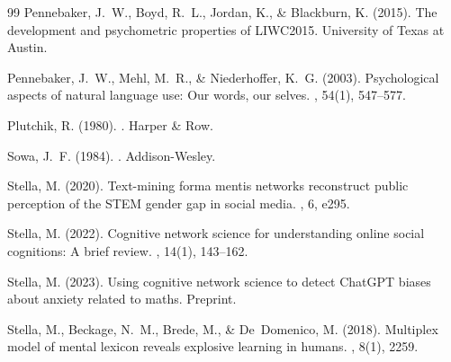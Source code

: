 \documentclass[11pt,a4paper]{article}
\begin{document}
\begin{thebibliography}{99}
Pennebaker, J.~W., Boyd, R.~L., Jordan, K., \& Blackburn, K. (2015).
\newblock The development and psychometric properties of {LIWC2015}.
\newblock University of Texas at Austin.

Pennebaker, J.~W., Mehl, M.~R., \& Niederhoffer, K.~G. (2003).
\newblock Psychological aspects of natural language use: Our words, our selves.
, 54(1), 547--577.

Plutchik, R. (1980).
.
\newblock Harper \& Row.

Sowa, J.~F. (1984).
.
\newblock Addison-Wesley.

Stella, M. (2020).
\newblock Text-mining forma mentis networks reconstruct public perception of the STEM gender gap in social media.
, 6, e295.

Stella, M. (2022).
\newblock Cognitive network science for understanding online social cognitions: A brief review.
, 14(1), 143--162.

Stella, M. (2023).
\newblock Using cognitive network science to detect {ChatGPT} biases about anxiety related to maths.
\newblock Preprint.

Stella, M., Beckage, N.~M., Brede, M., \& De~Domenico, M. (2018).
\newblock Multiplex model of mental lexicon reveals explosive learning in humans.
, 8(1), 2259.

\end{thebibliography}
\end{document}
